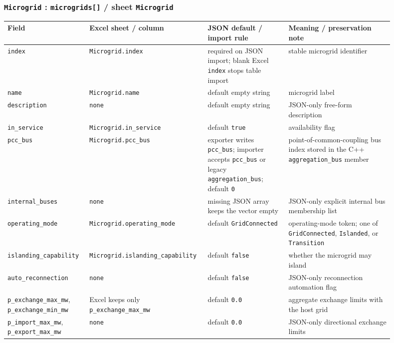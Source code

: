\subsubsection*{\texttt{Microgrid} : \texttt{microgrids[]} / sheet \texttt{Microgrid}}

\begin{longtable}{L{0.20\linewidth}L{0.24\linewidth}L{0.20\linewidth}L{0.26\linewidth}}
\toprule
Field & Excel sheet / column & JSON default / import rule & Meaning / preservation note \\
\midrule
\endhead
\texttt{index} & \texttt{Microgrid.index} & required on JSON import; blank Excel \texttt{index} stops table import & stable microgrid identifier \\
\texttt{name} & \texttt{Microgrid.name} & default empty string & microgrid label \\
\texttt{description} & \texttt{none} & default empty string & JSON-only free-form description \\
\texttt{in\_service} & \texttt{Microgrid.in\_service} & default \texttt{true} & availability flag \\
\texttt{pcc\_bus} & \texttt{Microgrid.pcc\_bus} & exporter writes \texttt{pcc\_bus}; importer accepts \texttt{pcc\_bus} or legacy \texttt{aggregation\_bus}; default \texttt{0} & point-of-common-coupling bus index stored in the C++ \texttt{aggregation\_bus} member \\
\texttt{internal\_buses} & \texttt{none} & missing JSON array keeps the vector empty & JSON-only explicit internal bus membership list \\
\texttt{operating\_mode} & \texttt{Microgrid.operating\_mode} & default \texttt{GridConnected} & operating-mode token; one of \texttt{GridConnected}, \texttt{Islanded}, or \texttt{Transition} \\
\texttt{islanding\_capability} & \texttt{Microgrid.islanding\_capability} & default \texttt{false} & whether the microgrid may island \\
\texttt{auto\_reconnection} & \texttt{none} & default \texttt{false} & JSON-only reconnection automation flag \\
\texttt{p\_exchange\_max\_mw}, \texttt{p\_exchange\_min\_mw} & Excel keeps only \texttt{p\_exchange\_max\_mw} & default \texttt{0.0} & aggregate exchange limits with the host grid \\
\texttt{p\_import\_max\_mw}, \texttt{p\_export\_max\_mw} & \texttt{none} & default \texttt{0.0} & JSON-only directional exchange limits \\

\end{longtable}
